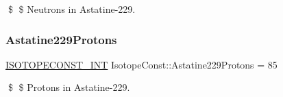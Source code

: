 \$ \$ Neutrons in Astatine-\/229. \mbox{\label{group___isotope_const-_astatine-_at229_gac389bfad6fa046a947c4c52e6773f0e7}} 
\subsubsection{\texorpdfstring{Astatine229\+Protons}{Astatine229Protons}}
{\footnotesize\ttfamily \mbox{\hyperlink{group___isotope_const-_macros_ga5f18360b3e99483a35c32d789e62621c}{I\+S\+O\+T\+O\+P\+E\+C\+O\+N\+S\+T\+\_\+\+I\+NT}} Isotope\+Const\+::\+Astatine229\+Protons = 85}

\$ \$ Protons in Astatine-\/229. 